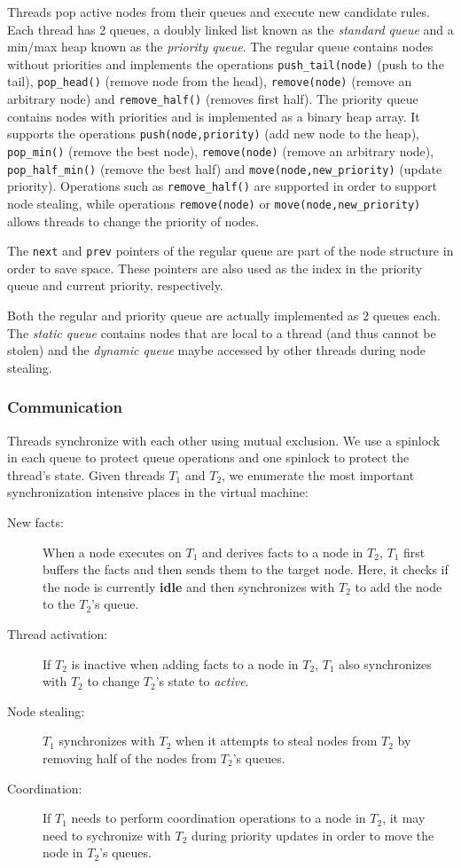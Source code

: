 Threads pop active nodes from their queues and execute new candidate rules. 
Each thread has 2 queues, a doubly linked list known as the \emph{standard
queue} and a min/max heap known as the \emph{priority queue}. The regular queue
contains nodes without priorities and
implements the operations \texttt{push\_tail(node)} (push to the tail),
\texttt{pop\_head()} (remove node from the head),
\texttt{remove(node)} (remove an arbitrary node) and \texttt{remove\_half()}
(removes first half). The priority queue contains nodes
with priorities and is implemented as a binary heap array. It supports the
operations \texttt{push(node,priority)} (add new node to the heap),
           \texttt{pop\_min()} (remove the best node),
\texttt{remove(node)} (remove an arbitrary node), \texttt{pop\_half\_min()}
(remove the best half) and \texttt{move(node,new\_priority)} (update priority).
Operations such as \texttt{remove\_half()} are supported in order to support
node stealing, while operations \texttt{remove(node)} or
\texttt{move(node,new\_priority)} allows threads to change the priority of
nodes.

The \texttt{next} and \texttt{prev} pointers of the regular queue are part of
the node structure in order to save space. These pointers are also used as the
index in the priority queue and current priority, respectively.

Both the regular and priority queue are actually implemented as 2 queues each.
The \emph{static queue} contains nodes that are local to a thread (and thus cannot be stolen) and
the \emph{dynamic queue} maybe accessed by other threads during node stealing.

\subsubsection{Communication}

Threads synchronize with each other using mutual exclusion. We use a spinlock in
each queue to protect queue operations and one spinlock to protect the thread's
state. Given threads $T_1$ and $T_2$, we enumerate the most important
synchronization intensive places in the virtual machine:

\begin{description}
   \item[New facts:] When a node executes on $T_1$ and derives facts
   to a node in $T_2$, $T_1$ first buffers the facts 
   and then sends them to the target node. Here, it checks if the
   node is currently \textbf{idle} and then synchronizes with $T_2$ to add the
   node to the $T_2$'s queue.
   \item[Thread activation:] If $T_2$ is inactive when adding facts to a node in
   $T_2$, $T_1$ also synchronizes with $T_2$ to change $T_2$'s state to \emph{active}.
   \item[Node stealing:] $T_1$ synchronizes with $T_2$ when it attempts to steal
   nodes from $T_2$ by removing half of the nodes from $T_2$'s queues.
   \item[Coordination:] If $T_1$ needs to perform coordination operations
   to a node in $T_2$, it may need to sychronize with $T_2$ during priority
   updates in order to move the node in $T_2$'s queues.
\end{description}

